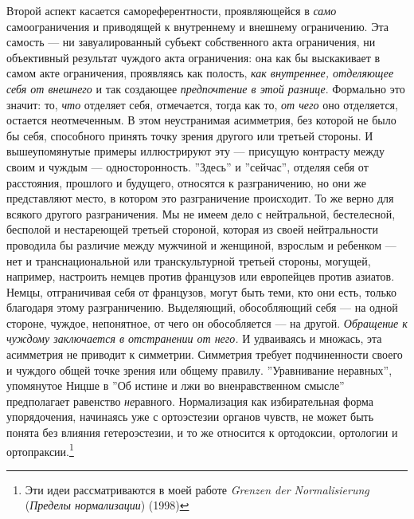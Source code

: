 \documentclass[12pt]{book}
\begin{document}
Второй аспект касается самореферентности, проявляющейся в \textit{само} самоограничения и приводящей к внутреннему и внешнему ограничению. Эта самость --- ни завуалированный субъект собственного акта ограничения, ни объективный результат чуждого акта ограничения: она как бы выскакивает в самом акте ограничения, проявляясь как полость, \textit{как внутреннее, отделяющее себя от внешнего} и так создающее \textit{предпочтение в этой разнице}. Формально это значит: то, \textit{что} отделяет себя, отмечается, тогда как то, \textit{от чего} оно отделяется, остается неотмеченным. В этом неустранимая асимметрия, без которой не было бы себя, способного принять точку зрения другого или третьей стороны. И вышеупомянутые примеры иллюстрируют эту --- присущую контрасту между своим и чуждым --- односторонность. ''Здесь'' и ''сейчас'', отделяя себя от расстояния, прошлого и будущего, относятся к разграничению, но они же представляют место, в котором это разграничение происходит. То же верно для всякого другого разграничения. Мы не имеем дело с нейтральной, бестелесной, бесполой и нестареющей третьей стороной, которая из своей нейтральности проводила бы различие между мужчиной и женщиной, взрослым и ребенком --- нет и транснациональной или транскультурной третьей стороны, могущей, например, настроить немцев против французов или европейцев против азиатов. Немцы, отграничивая себя от французов, могут быть теми, кто они есть, только благодаря этому разграничению. Выделяющий, обособляющий себя --- на одной стороне, чуждое, непонятное, от чего он обособляется --- на другой. \textit{Обращение к чуждому заключается в отстранении от него.} И удваиваясь и множась, эта асимметрия не приводит к симметрии. Симметрия требует подчиненности своего и чуждого общей точке зрения или общему правилу. ''Уравнивание неравных'', упомянутое Ницше в ''Об истине и лжи во вненравственном смысле'' предполагает равенство \textit{не}равного. Нормализация как избирательная форма упорядочения, начинаясь уже с ортоэстезии органов чувств, не может быть понята без влияния гетероэстезии, и то же относится к ортодоксии, ортологии и ортопраксии.\footnote{Эти идеи рассматриваются в моей работе \textit{Grenzen der Normalisierung} (\textit{Пределы нормализации}) (1998)}
\end{document}
